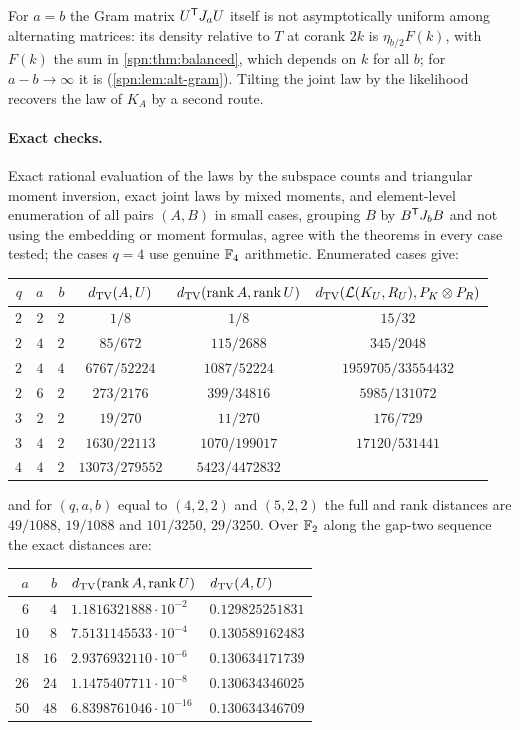 For $a=b$ the Gram matrix $U^{\mathsf{T}}J_aU$ itself is not asymptotically uniform among alternating
matrices: its density relative to $T$ at corank $2k$ is $\eta_{b/2}F(k)$, with $F(k)$ the sum in
\cref{spn:thm:balanced}, which depends on $k$ for all $b$; for $a-b\to\infty$ it is
(\cref{spn:lem:alt-gram}). Tilting the joint law by the likelihood recovers the law of $K_A$ by a
second route.

\paragraph{Exact checks.} Exact rational evaluation of the laws by the subspace counts and
triangular moment inversion, exact joint laws by mixed moments, and element-level enumeration of
all pairs $(A,B)$ in small cases, grouping $B$ by $B^{\mathsf{T}}J_bB$ and not using the embedding or
moment formulas, agree with the theorems in every case tested; the cases $q=4$ use genuine $\mathbb{F}_4$
arithmetic. Enumerated cases give:
\begin{center}\small
\begin{tabular}{rrrccc}
\toprule
$q$&$a$&$b$&$d_{\mathrm{TV}}(A,U)$&$d_{\mathrm{TV}}(\operatorname{rank} A,\operatorname{rank} U)$&$d_{\mathrm{TV}}(\mathcal L(K_U,R_U),P_K\otimes P_R)$\\
\midrule
$2$&$2$&$2$&$1/8$&$1/8$&$15/32$\\
$2$&$4$&$2$&$85/672$&$115/2688$&$345/2048$\\
$2$&$4$&$4$&$6767/52224$&$1087/52224$&$1959705/33554432$\\
$2$&$6$&$2$&$273/2176$&$399/34816$&$5985/131072$\\
$3$&$2$&$2$&$19/270$&$11/270$&$176/729$\\
$3$&$4$&$2$&$1630/22113$&$1070/199017$&$17120/531441$\\
$4$&$4$&$2$&$13073/279552$&$5423/4472832$&\\
\bottomrule
\end{tabular}
\end{center}
and for $(q,a,b)$ equal to $(4,2,2)$ and $(5,2,2)$ the full and rank distances are $49/1088$,
$19/1088$ and $101/3250$, $29/3250$. Over $\mathbb{F}_2$ along the gap-two sequence the exact distances
are:
\begin{center}\small
\begin{tabular}{rrll}
\toprule
$a$&$b$&$d_{\mathrm{TV}}(\operatorname{rank} A,\operatorname{rank} U)$&$d_{\mathrm{TV}}(A,U)$\\
\midrule
$6$&$4$&$1.1816321888\cdot10^{-2}$&$0.129825251831$\\
$10$&$8$&$7.5131145533\cdot10^{-4}$&$0.130589162483$\\
$18$&$16$&$2.9376932110\cdot10^{-6}$&$0.130634171739$\\
$26$&$24$&$1.1475407711\cdot10^{-8}$&$0.130634346025$\\
$50$&$48$&$6.8398761046\cdot10^{-16}$&$0.130634346709$\\
\bottomrule
\end{tabular}
\end{center}
